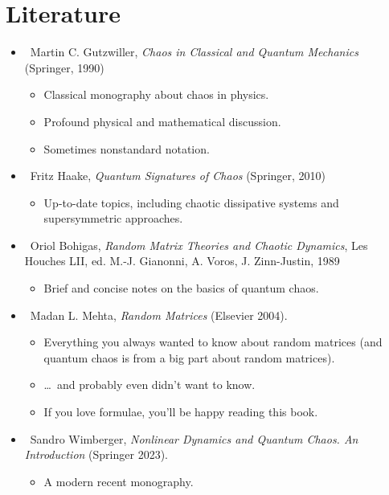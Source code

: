 \documentclass[a4paper,11pt,twoside]{article}
\begin{document}
\section{Literature}
\begin{itemize}
    \item \cite{Gut90}~Martin C. Gutzwiller, {\it Chaos in Classical and Quantum Mechanics} (Springer, 1990)
        \begin{itemize}
            \item Classical monography about chaos in physics.
            \item Profound physical and mathematical discussion.
            \item Sometimes nonstandard notation.
        \end{itemize}

    \item \cite{Haa10}~Fritz Haake, {\it Quantum Signatures of Chaos} (Springer, 2010)
        \begin{itemize}
            \item Up-to-date topics, including chaotic dissipative systems and supersymmetric approaches.
        \end{itemize}

    \item \cite{Boh89}~Oriol Bohigas, {\it Random Matrix Theories and Chaotic Dynamics}, Les Houches LII, ed. M.-J. Gianonni, A. Voros, J. Zinn-Justin, 1989
        \begin{itemize}
            \item Brief and concise notes on the basics of quantum chaos.
        \end{itemize}

    \item \cite{Meh04}~Madan L. Mehta, {\it Random Matrices} (Elsevier 2004).
        \begin{itemize}
            \item Everything you always wanted to know about random matrices (and quantum chaos is from a big part about random matrices).
            \item \dots~and probably even didn't want to know.
            \item If you love formulae, you'll be happy reading this book.
        \end{itemize}

    \item \cite{Wimberger2023}~Sandro Wimberger, {\it Nonlinear Dynamics and Quantum Chaos. An Introduction} (Springer 2023).
        \begin{itemize}
            \item A modern recent monography.
        \end{itemize}

    \end{itemize}
\end{document}
